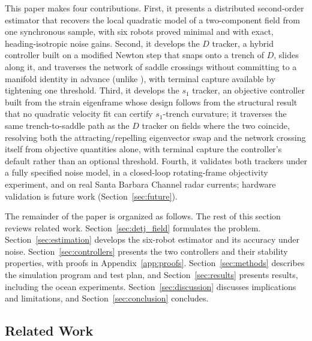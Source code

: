 \documentclass[lettersize,journal]{IEEEtran}
\begin{document}
This paper makes four contributions. First, it presents a distributed
second-order estimator that recovers the local quadratic model of a
two-component field from one synchronous sample, with six robots proved
minimal and with exact, heading-isotropic noise gains. Second, it
develops the $D$ tracker, a hybrid controller built on a modified
Newton step that snaps onto a trench of $D$, slides along it, and
traverses the network of saddle crossings without committing to a
manifold identity in advance (unlike \cite{9,10}), with terminal
capture available by tightening one threshold. Third, it develops the
$s_1$ tracker, an objective controller built from the strain
eigenframe whose design follows from the structural result that no
quadratic velocity fit can certify $s_1$-trench curvature; it traverses
the same trench-to-saddle path as the $D$ tracker on fields where the
two coincide, resolving both the attracting/repelling eigenvector swap
and the network crossing itself from objective quantities alone, with
terminal capture the controller's default rather than an optional
threshold. Fourth, it validates both trackers under a fully specified
noise model, in a closed-loop rotating-frame objectivity experiment,
and on real Santa Barbara Channel radar currents; hardware validation
is future work (Section~\ref{sec:future}).

The remainder of the paper is organized as follows. The rest of this
section reviews related work. Section~\ref{sec:detj_field} formulates
the problem. Section~\ref{sec:estimation} develops the six-robot
estimator and its accuracy under noise. Section~\ref{sec:controllers}
presents the two controllers and their stability properties, with
proofs in Appendix~\ref{app:proofs}. Section~\ref{sec:methods}
describes the simulation program and test plan, and
Section~\ref{sec:results} presents results, including the ocean
experiments. Section~\ref{sec:discussion} discusses implications and
limitations, and Section~\ref{sec:conclusion} concludes.

\subsection{Related Work}
\label{sec:related_robots}
\end{document}
